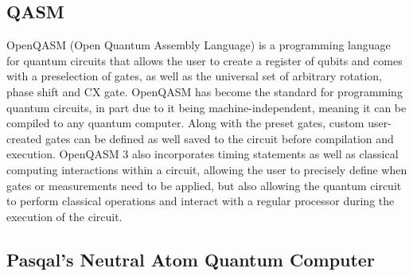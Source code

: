 \subsection{QASM}
\label{sec:Qasm}
OpenQASM (Open Quantum Assembly Language) is a programming language for quantum circuits that allows the user to create a register of qubits and comes with a preselection of gates, as well as the universal set of arbitrary rotation,
 phase shift and CX gate. OpenQASM has become the standard for programming quantum circuits, in part due to it being machine-independent, meaning it can be compiled to any
  quantum computer\cite{crossOpenQASMBroaderDeeper2022}. 
  Along with the preset gates, custom user-created gates can be defined as well saved to the circuit before compilation and execution. 
  OpenQASM 3 also incorporates timing statements as well as classical computing interactions within a circuit, allowing the user to precisely define when gates or 
  measurements need to be applied, but also allowing the quantum circuit to perform classical operations and interact with a regular processor during the execution of the circuit\cite{crossOpenQASMBroaderDeeper2022}.


\newpage
\subsection{Pasqal's Neutral Atom Quantum Computer}
\label{sec:NAQC}
